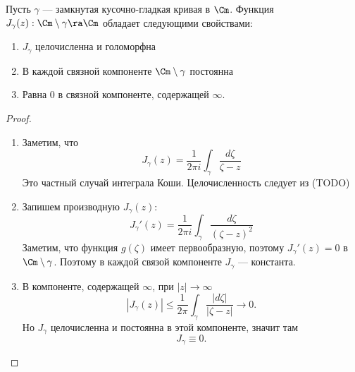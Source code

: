 \begin{theorem}
    Пусть \(\gamma\) --- замкнутая кусочно-гладкая кривая в \(\Cm\). Функция \(J_\gamma(z): \Cm \setminus \gamma \ra \Cm\) обладает следующими свойствами:
    \begin{enumerate}
        \item \(J_\gamma\) целочисленна и голоморфна
        \item В каждой связной компоненте \(\Cm \setminus \gamma\) постоянна
        \item Равна \(0\) в связной компоненте, содержащей \(\infty\).
    \end{enumerate}
\end{theorem}
\begin{proof}
    \begin{enumerate}
        \item Заметим, что \[J_\gamma(z) = \frac{1}{2\pi i}\int_\gamma \frac{d\zeta}{\zeta - z}\]
        Это частный случай интеграла Коши. Целочисленность следует из (TODO) 
        \item Запишем производную \(J_\gamma(z)\):
        \[J_\gamma'(z) = \frac{1}{2\pi i}\int_\gamma \frac{d\zeta}{(\zeta - z)^2}\]
        Заметим, что функция \(g(\zeta)\) имеет первообразную, поэтому \(J_\gamma'(z) = 0\) в \(\Cm \setminus \gamma\). Поэтому в каждой связой компоненте \(J_\gamma\) --- константа.
        \item В компоненте, содержащей \(\infty\), при \(|z| \to \infty\)
        \[
            |J_\gamma(z)|
            \le
            \frac{1}{2\pi}\int_\gamma \frac{|d\zeta|}{|\zeta - z|}
            \to 0.
        \]
        Но \(J_\gamma\) целочисленна и постоянна в этой компоненте, значит там
        \[
            J_\gamma \equiv 0.
        \]
    \end{enumerate}
\end{proof}

